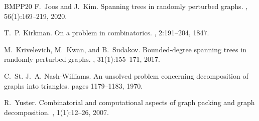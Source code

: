 \documentclass[11pt,reqno]{amsart}
\theoremstyle{definition}
\theoremstyle{remark}
\begin{document}
\begin{thebibliography}{BMPP20}
F.~Joos and J.~Kim.
\newblock Spanning trees in randomly perturbed graphs.
, 56(1):169--219, 2020.

T.~P. Kirkman.
\newblock On a problem in combinatorics.
, 2:191--204, 1847.

M.~Krivelevich, M.~Kwan, and B.~Sudakov.
\newblock Bounded-degree spanning trees in randomly perturbed graphs.
, 31(1):155--171, 2017.

C.~St. J.~A. Nash-Williams.
\newblock An unsolved problem concerning decomposition of graphs into triangles.
\newblock pages 1179--1183, 1970.

R.~Yuster.
\newblock Combinatorial and computational aspects of graph packing and graph decomposition.
, 1(1):12--26, 2007.

\end{thebibliography}
\end{document}
